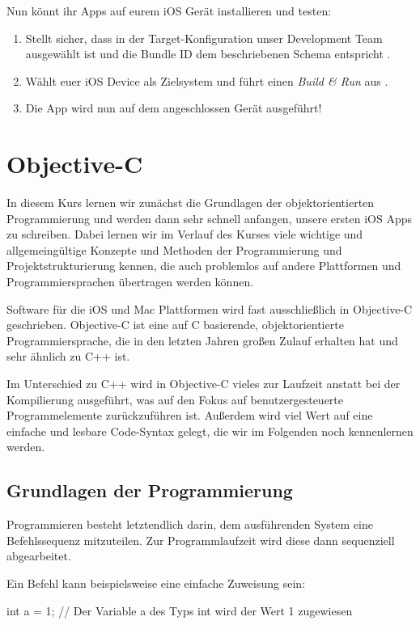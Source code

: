 \documentclass[parskip=half, final]{scrreprt}
\begin{document}
Nun könnt ihr Apps auf eurem iOS Gerät installieren und testen:
\begin{enumerate}
\item Stellt sicher, dass in der Target-Konfiguration unser Development Team ausgewählt ist und die Bundle ID dem beschriebenen Schema entspricht .
\item Wählt euer iOS Device als Zielsystem und führt einen \emph{Build \& Run} aus .
\item Die App wird nun auf dem angeschlossen Gerät ausgeführt!
\end{enumerate}


\chapter{Objective-C}

In diesem Kurs lernen wir zunächst die Grundlagen der objektorientierten Programmierung und werden dann sehr schnell anfangen, unsere ersten iOS Apps zu schreiben. Dabei lernen wir im Verlauf des Kurses viele wichtige und allgemeingültige Konzepte und Methoden der Programmierung und Projektstrukturierung kennen, die auch problemlos auf andere Plattformen und Programmiersprachen übertragen werden können.

Software für die iOS und Mac Plattformen wird fast ausschließlich in Objective-C geschrieben. Objective-C ist eine auf C basierende, objektorientierte Programmiersprache, die in den letzten Jahren großen Zulauf erhalten hat und sehr ähnlich zu C++ ist.

Im Unterschied zu C++ wird in Objective-C vieles zur Laufzeit anstatt bei der Kompilierung ausgeführt, was auf den Fokus auf benutzergesteuerte Programmelemente zurückzuführen ist. Außerdem wird viel Wert auf eine einfache und lesbare Code-Syntax gelegt, die wir im Folgenden noch kennenlernen werden.

\section{Grundlagen der Programmierung}

Programmieren besteht letztendlich darin, dem ausführenden System eine Befehlssequenz mitzuteilen. Zur Programmlaufzeit wird diese dann sequenziell abgearbeitet.

Ein Befehl kann beispielsweise eine einfache Zuweisung sein:
\begin{objclst}
int a = 1; // Der Variable a des Typs int wird der Wert 1 zugewiesen
\end{objclst}
\end{document}
